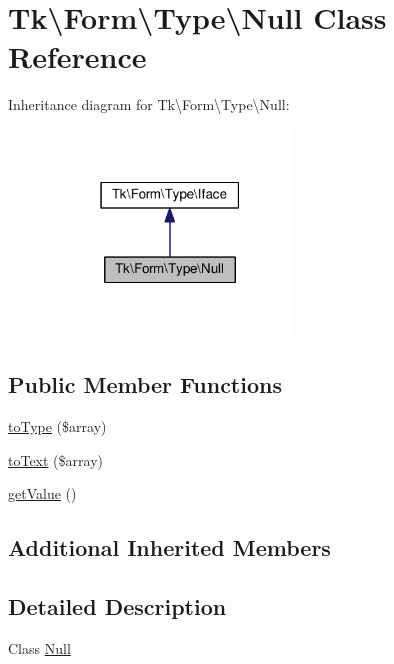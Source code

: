 \hypertarget{classTk_1_1Form_1_1Type_1_1Null}{\section{Tk\textbackslash{}Form\textbackslash{}Type\textbackslash{}Null Class Reference}
\label{classTk_1_1Form_1_1Type_1_1Null}
}


Inheritance diagram for Tk\textbackslash{}Form\textbackslash{}Type\textbackslash{}Null\+:\nopagebreak
\begin{figure}[H]
\begin{center}
\leavevmode
\includegraphics[width=183pt]{classTk_1_1Form_1_1Type_1_1Null__inherit__graph}
\end{center}
\end{figure}
\subsection*{Public Member Functions}
\begin{DoxyCompactItemize}
\item 
\hyperlink{classTk_1_1Form_1_1Type_1_1Null_a5115eb542ddf8fb9f8ee9f045c45ba24}{to\+Type} (\$array)
\item 
\hyperlink{classTk_1_1Form_1_1Type_1_1Null_a26eaf04c3f557e869207e6a377845103}{to\+Text} (\$array)
\item 
\hyperlink{classTk_1_1Form_1_1Type_1_1Null_a61650b38be82e170913d642910d70db9}{get\+Value} ()
\end{DoxyCompactItemize}
\subsection*{Additional Inherited Members}


\subsection{Detailed Description}
Class \hyperlink{classTk_1_1Form_1_1Type_1_1Null}{Null}

